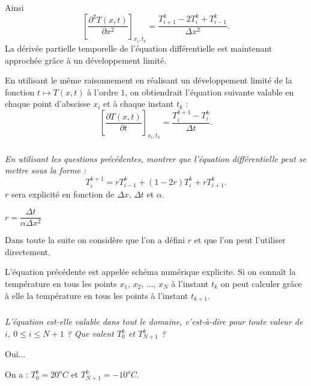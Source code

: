 \documentclass[10pt,fleqn]{article} %
\begin{document}
\begin{multicols}{2}
\begin{multicols}{2}
Ainsi 
$$
\left[\dfrac{\partial^2 T(x,t)}{\partial x^2}\right]_{x_i,t_k} 
=
\dfrac{T_{i+1}^k-2T_{i}^k + T_{i-1}^k}{\Delta x^2 }.
$$
La dérivée partielle temporelle de l'équation différentielle est maintenant approchée grâce à un
développement limité.

En utilisant le même raisonnement en réalisant un développement limité de la fonction 
$t\mapsto T(x,t)$ à l'ordre $1$, on obtiendrait l'équation suivante valable en chaque point
 d'abscisse $x_i$ et à chaque instant $t_k$ : 
$$
\left[\dfrac{\partial T(x,t)}{\partial t}\right]_{x_i,t_k} 
=
\dfrac{T_{i}^{k+1}- T_{i}^k}{\Delta t }.
$$



\subparagraph{}\textit{En utilisant les questions précédentes, montrer que 
l'équation différentielle peut se mettre sous la forme : 
$$
T_{i}^{k+1} = r T_{i-1}^{k} + \left( 1-2r \right) T_i^k + r T_{i+1}^k.
$$ 
}
$r$ sera explicité en fonction de $\Delta x$, $\Delta t$ et $\alpha$.
\ifprof
\begin{corrige}
$r=\dfrac{\Delta t}{\alpha \Delta x^2}$
\end{corrige}
\else
\fi

\ifprof
\else
\vspace{.5cm}

Dans toute la suite on considère que l'on a défini $r$ et que l'on peut l'utiliser directement. 
\vspace{.5cm}

L'équation précédente est appelée schéma numérique explicite. Si on connaît la température en tous les points $x_1$, $x_2$, ..., $x_N$ à  l'instant $t_k$ on peut calculer grâce à elle la température en tous les points à l'instant $t_{k+1}$.
\fi

\subparagraph{}\textit{L'équation est-elle valable dans tout le domaine, c'est-à-dire pour toute valeur de $i$, $0\leq i\leq N+1$ ? Que valent $T_0^k$ et $T_{N+1}^k$ ?}
\ifprof

\begin{corrige}
Oui...

On a : $T_0^k = 20^o C$ et $T^k_{N+1}=-10^o C$.  
\end{corrige}
\else
\fi



\end{multicols}
\end{multicols}
\end{document}
